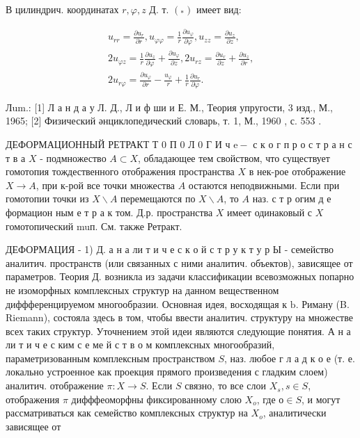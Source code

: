 \documentclass[10pt]{article}
\begin{document}
В цилиндрич. координатах $r, \varphi, z$ Д. т. $\left({ }_{*}\right)$ имеет вид:



\[

\begin{gathered}

u_{r r}=\frac{\partial u_{r}}{\partial r}, u_{\varphi \varphi}=\frac{1}{r} \frac{\partial u_{\varphi}}{\partial \varphi}, u_{z z}=\frac{\partial u_{z}}{\partial z}, \\

2 u_{\varphi z}=\frac{1}{r} \frac{\partial u_{z}}{\partial \varphi}+\frac{\partial u_{\varphi}}{\partial z}, 2 u_{r z}=\frac{\partial u_{r}}{\partial z}+\frac{\partial u_{z}}{\partial r}, \\

2 u_{r \varphi}=\frac{\partial u_{\varphi}}{\partial r}-\frac{u_{\varphi}}{r}+\frac{1}{r} \frac{\partial u_{r}}{\partial \varphi} .

\end{gathered}

\]



Лum.: [1] Л а н д а у Л. Д., Л и ф ши и Е. М., Теория упругости, 3 изд., М., 1965; [2] Физический әнциклопедический словарь, т. 1, М., 1960 , с. 553 .



ДЕФОРМАЦИОННЫЙ РЕТРАКТ Т 0 П 0 Л 0 Г И ч $\mathrm{e}-$ с к о г п р о с т р а н с т в а $X$ - подмножество $A \subset X$, обладающее тем свойством, что существует гомотопия тождественного отображения пространства $X$ в нек-рое отображение $X \rightarrow A$, при к-рой все точки множества $A$ остаются неподвижными. Если при гомотопии точки из $X \backslash A$ перемещаются по $X \backslash A$, то $A$ наз. с т р огим д е формацион ным е т р а к том. Д.р. пространства $X$ имеет одинаковый с $X$ гомотопический muп. См. также Ретракт.



ДЕФОРМАЦИЯ - 1) Д. а н а ли т и ч е с к о й с т р у к т у р Ы - семейство аналитич. пространств (или связанных с ними аналитич. объектов), зависящее от параметров. Теория Д. возникла из задачи классификации всевозможных попарно не изоморфных комплексных структур на данном вещественном диффференцируемом многообразии. Основная идея, восходящая к $\mathrm{b}$. Риману (B. Riemann), состояла здесь в том, чтобы ввести аналитич. структуру на множестве всех таких структур. Уточнением этой идеи являются следующие понятия. А н а ли т и ч е с ким с е ме й с т в о м комплексных многообразий, параметризованным комплексным пространством $S$, наз. любое г л а д к о е (т. е. локально устроенное как проекция прямого произведения с гладким слоем) аналитич. отображение $\pi: X \rightarrow S$. Если $S$ связно, то все слои $X_{s}, s \in S$, отображения $\pi$ дифффеоморфны фиксированному слою $X_{o}$, где $о \in S$, и могут рассматриваться как семейство комплексных структур на $X_{o}$, аналитически зависящее от
\end{document}
